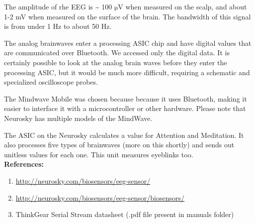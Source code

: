 \documentclass[12pt]{article}
\begin{document}
The amplitude of rhe EEG is \textasciitilde{} 100 $\mathrm{\mu}$V when measured
on the scalp, and about 1-2 mV when measured on the surface of the brain. The
bandwidth of this signal is from under 1 Hz to about 50 Hz.


The analog brainwaves enter a processing ASIC chip and have digital values that are communicated over Bluetooth. We accessed only the digital data. It is certainly possible to look at the analog brain waves before they enter the processing ASIC, but it would be much more difficult, requiring a schematic and specialized oscilloscope probes.


The Mindwave Mobile was chosen because because it uses Bluetooth, making it easier to interface it with a microcontroller or other hardware. Please note that Neurosky has multiple models of the MindWave.


The ASIC on the Neurosky calculates a value for Attention and Meditation. It also processes five types of brainwaves (more on this shortly) and sends out unitless values for each one. This unit measures eyeblinks too.\\


\textbf{{\large References:}}

\begin{enumerate}
	\item \href{http://neurosky.com/biosensors/eeg-sensor/}{http://neurosky.com/biosensors/eeg-sensor/}
	\item \href{http://neurosky.com/biosensors/eeg-sensor/biosensors/}{http://neurosky.com/biosensors/eeg-sensor/biosensors/}
	\item ThinkGear Serial Stream datasheet (.pdf file present in manuals folder)
\end{enumerate}
\end{document}
